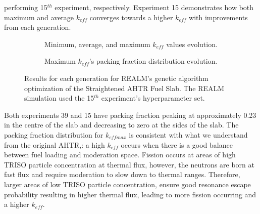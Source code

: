 performing 15$^{th}$ experiment, respectively. 
Experiment 15 demonstrates how both maximum and average $k_{eff}$ converges 
towards a higher $k_{eff}$ with improvements from each generation.
\begin{figure}[]
    \centering
    \begin{subfigure}{\textwidth}
    \caption{Minimum, average, and maximum $k_{eff}$ values evolution.}
    \label{fig:keff_conv_15}
    \end{subfigure}
    \begin{subfigure}{\textwidth}
        \caption{Maximum $k_{eff}$'s packing fraction distribution evolution.}
        \label{fig:pf_15}
    \end{subfigure}
    \caption{ Results for each generation for REALM's genetic algorithm optimization 
    of the Straightened \acrfull{AHTR} Fuel Slab. The REALM simulation used 
    the 15$^{th}$ experiment's hyperparameter set.}
    \label{fig:15}
\end{figure}

Both experiments 39 and 15 have packing fraction peaking at approximately 
0.23 in the centre of the slab and decreasing to zero at the sides of the slab.  
The packing fraction distribution for $k_{eff max}$ is consistent with what we 
understand from the original \gls{AHTR},: a high $k_{eff}$ occurs when there is 
a good balance between fuel loading and moderation space. 
Fission occurs at areas of high TRISO particle concentration at thermal flux, 
however, the neutrons are born at fast flux and require moderation to slow down 
to thermal ranges.
Therefore, larger areas of low TRISO particle concentration, ensure good 
resonance escape probability resulting in higher thermal flux, leading to more 
fission occurring and a higher $k_{eff}$. 

